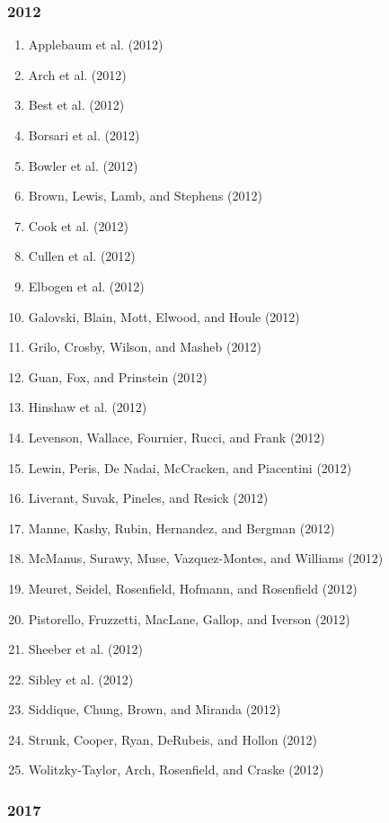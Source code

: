 \documentclass[english,man]{apa6}
\providecommand{\tightlist}{%
  \setlength{\itemsep}{0pt}\setlength{\parskip}{0pt}}
\begin{document}
\subsubsection{2012}\label{section-2}

\begin{enumerate}
\def\labelenumi{\arabic{enumi})}
\tightlist
\item
  Applebaum et al. (2012)
\item
  Arch et al. (2012)
\item
  Best et al. (2012)
\item
  Borsari et al. (2012)
\item
  Bowler et al. (2012)
\item
  Brown, Lewis, Lamb, and Stephens (2012)
\item
  Cook et al. (2012)
\item
  Cullen et al. (2012)
\item
  Elbogen et al. (2012)
\item
  Galovski, Blain, Mott, Elwood, and Houle (2012)
\item
  Grilo, Crosby, Wilson, and Masheb (2012)
\item
  Guan, Fox, and Prinstein (2012)
\item
  Hinshaw et al. (2012)
\item
  Levenson, Wallace, Fournier, Rucci, and Frank (2012)
\item
  Lewin, Peris, De Nadai, McCracken, and Piacentini (2012)
\item
  Liverant, Suvak, Pineles, and Resick (2012)
\item
  Manne, Kashy, Rubin, Hernandez, and Bergman (2012)
\item
  McManus, Surawy, Muse, Vazquez-Montes, and Williams (2012)
\item
  Meuret, Seidel, Rosenfield, Hofmann, and Rosenfield (2012)
\item
  Pistorello, Fruzzetti, MacLane, Gallop, and Iverson (2012)
\item
  Sheeber et al. (2012)
\item
  Sibley et al. (2012)
\item
  Siddique, Chung, Brown, and Miranda (2012)
\item
  Strunk, Cooper, Ryan, DeRubeis, and Hollon (2012)
\item
  Wolitzky-Taylor, Arch, Rosenfield, and Craske (2012)
\end{enumerate}

\subsubsection{2017}\label{section-3}
\end{document}
